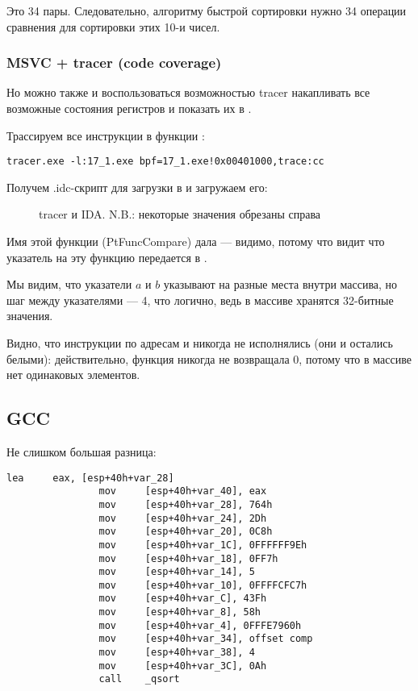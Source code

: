 Это 34 пары.
Следовательно, алгоритму быстрой сортировки нужно 34 операции сравнения для сортировки этих 10-и чисел.

\clearpage
\subsubsection{MSVC + tracer (code coverage)}

Но можно также и воспользоваться возможностью tracer накапливать все возможные состояния регистров и показать их в \IDA.

Трассируем все инструкции в функции \comp:

\begin{lstlisting}
tracer.exe -l:17_1.exe bpf=17_1.exe!0x00401000,trace:cc
\end{lstlisting}

Получем .idc-скрипт для загрузки в \IDA и загружаем его:

\begin{figure}[H]
\centering
{}
\caption{tracer и IDA. N.B.: 
некоторые значения обрезаны справа}
\label{fig:qsort_tracer_cc}
\end{figure}

Имя этой функции (PtFuncCompare) дала \IDA --- видимо, потому что видит что указатель на эту функцию передается в \qsort.

Мы видим, что указатели $a$ и $b$ указывают на разные места внутри массива, 
но шаг между указателями --- 4, что логично, ведь в массиве хранятся 32-битные значения.

Видно, что инструкции по адресам  и  никогда не исполнялись (они и остались белыми): 
действительно, функция \comp никогда не возвращала 0,
потому что в массиве нет одинаковых элементов.

\subsection{GCC}

Не слишком большая разница:

\begin{lstlisting}[caption=GCC,style=customasmx86]
                lea     eax, [esp+40h+var_28]
                mov     [esp+40h+var_40], eax
                mov     [esp+40h+var_28], 764h
                mov     [esp+40h+var_24], 2Dh
                mov     [esp+40h+var_20], 0C8h
                mov     [esp+40h+var_1C], 0FFFFFF9Eh
                mov     [esp+40h+var_18], 0FF7h
                mov     [esp+40h+var_14], 5
                mov     [esp+40h+var_10], 0FFFFCFC7h
                mov     [esp+40h+var_C], 43Fh
                mov     [esp+40h+var_8], 58h
                mov     [esp+40h+var_4], 0FFFE7960h
                mov     [esp+40h+var_34], offset comp
                mov     [esp+40h+var_38], 4
                mov     [esp+40h+var_3C], 0Ah
                call    _qsort
\end{lstlisting}

